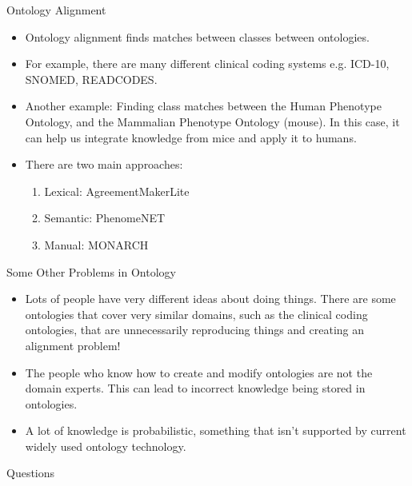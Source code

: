 \documentclass[aspectratio=169]{beamer} %
\begin{document}
\begin{frame}{Ontology Alignment}
  \begin{itemize}
    \item Ontology alignment finds matches between classes between ontologies. 
    \item For example, there are many different clinical coding systems e.g.
    ICD-10, SNOMED, READCODES.
    \item Another example: Finding class matches between the Human Phenotype
    Ontology, and the Mammalian Phenotype Ontology (mouse). In this case, it can
    help us integrate knowledge from mice and apply it to humans.
    \item There are two main approaches:
      \begin{enumerate}
        \item Lexical: AgreementMakerLite
        \item Semantic: PhenomeNET
        \item Manual: MONARCH
      \end{enumerate}
  \end{itemize}
\end{frame}

\begin{frame}{Some Other Problems in Ontology}
  \begin{itemize}
    \item Lots of people have very different ideas about doing things. There are some ontologies that cover very similar domains, such as the clinical coding ontologies, that are unnecessarily reproducing things and creating an alignment problem!
    \item The people who know how to create and modify ontologies are not the domain experts. This can lead to incorrect knowledge being stored in ontologies.
    \item A lot of knowledge is probabilistic, something that isn't supported by current widely used ontology technology.
  \end{itemize}
\end{frame}

\begin{frame}{Questions}

\end{frame}
\end{document}
